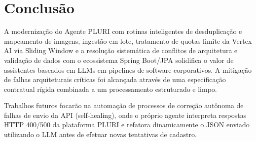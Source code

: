 \documentclass[sigconf]{acmart}
\begin{document}
\section{Conclusão}
A modernização do Agente PLURI com rotinas inteligentes de desduplicação e mapeamento de imagens, ingestão em lote, tratamento de quotas limite da Vertex AI via Sliding Window e a resolução sistemática de conflitos de arquitetura e validação de dados com o ecossistema Spring Boot/JPA solidifica o valor de assistentes baseados em LLMs em pipelines de software corporativos. A mitigação de falhas arquiteturais críticas foi alcançada através de uma especificação contratual rígida combinada a um processamento estruturado e limpo.

Trabalhos futuros focarão na automação de processos de correção autônoma de falhas de envio da API (self-healing), onde o próprio agente interpreta respostas HTTP 400/500 da plataforma PLURI e refatora dinamicamente o JSON enviado utilizando o LLM antes de efetuar novas tentativas de cadastro.



\end{document}

